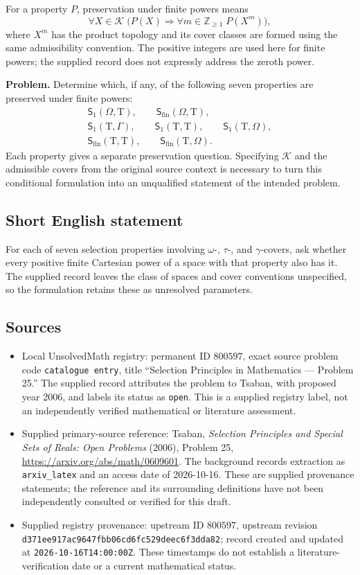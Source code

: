\documentclass[11pt]{article}
\newcommand{\Z}{\mathbb{Z}}
\begin{document}
For a property \(P\), preservation under finite powers means
\[
\forall X\in\mathcal K\;\bigl(P(X)\Longrightarrow
\forall m\in\Z_{\geq1}\;P(X^m)\bigr),
\]
where \(X^m\) has the product topology and its cover classes are formed using the same admissibility convention. The positive integers are used here for finite powers; the supplied record does not expressly address the zeroth power.

\textbf{Problem.} Determine which, if any, of the following seven properties are preserved under finite powers:
\[
\begin{gathered}
\mathsf S_1(\Omega,\mathrm T),\qquad
\mathsf S_{\mathrm{fin}}(\Omega,\mathrm T),\\
\mathsf S_1(\mathrm T,\Gamma),\qquad
\mathsf S_1(\mathrm T,\mathrm T),\qquad
\mathsf S_1(\mathrm T,\Omega),\\
\mathsf S_{\mathrm{fin}}(\mathrm T,\mathrm T),\qquad
\mathsf S_{\mathrm{fin}}(\mathrm T,\Omega).
\end{gathered}
\]
Each property gives a separate preservation question. Specifying \(\mathcal K\) and the admissible covers from the original source context is necessary to turn this conditional formulation into an unqualified statement of the intended problem.
\subsection{Short English statement}
For each of seven selection properties involving \(\omega\)-, \(\tau\)-, and \(\gamma\)-covers, ask whether every positive finite Cartesian power of a space with that property also has it. The supplied record leaves the class of spaces and cover conventions unspecified, so the formulation retains these as unresolved parameters.
\subsection{Sources}
\begin{itemize}
\item Local UnsolvedMath registry: permanent ID \(800597\), exact source problem code \texttt{catalogue entry}, title ``Selection Principles in Mathematics --- Problem 25.'' The supplied record attributes the problem to Tsaban, with proposed year 2006, and labels its status as \texttt{open}. This is a supplied registry label, not an independently verified mathematical or literature assessment.
\item Supplied primary-source reference: Tsaban, \emph{Selection Principles and Special Sets of Reals: Open Problems} (2006), Problem 25, \url{https://arxiv.org/abs/math/0609601}. The background records extraction as \texttt{arxiv\_latex} and an access date of 2026-10-16. These are supplied provenance statements; the reference and its surrounding definitions have not been independently consulted or verified for this draft.
\item Supplied registry provenance: upstream ID \(800597\), upstream revision \texttt{d371ee917ac9647fbb06cd6fc529deec6f3dda82}; record created and updated at \texttt{2026-10-16T14:00:00Z}. These timestamps do not establish a literature-verification date or a current mathematical status.
\end{itemize}
\end{document}
